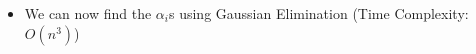 \begin{frame}
\begin{columns}
{\begin{overlayarea}{\textwidth}{\textheight}
\begin{itemize}
\begin{align*}
                   \visible<4->{\begin{bmatrix}z_1\\z_2\\ \vdots \\z_n\end{bmatrix} &= 
                                           \begin{bmatrix}
                                           	u_{11} & u_{21} & \hdots & u_{n1} \\
                                           	u_{12} & u_{22} & \hdots & u_{n2} \\
                                           	\vdots & \vdots & \vdots & \vdots \\
                                           	u_{1n} & u_{2n} & \hdots & u_{nn} \\
                                           \end{bmatrix}
                                           \begin{bmatrix} \alpha_1 \\ \alpha_2 \\ \vdots \\ \alpha_n\end{bmatrix} }
                \end{align*}
           \vspace{-0.4cm}
          \item<5-> We can now find the $\alpha_i$s using Gaussian Elimination (Time Complexity: $O(n^3)$)
        \end{itemize}
      \end{overlayarea}
    }
  \end{columns}
\end{frame}


